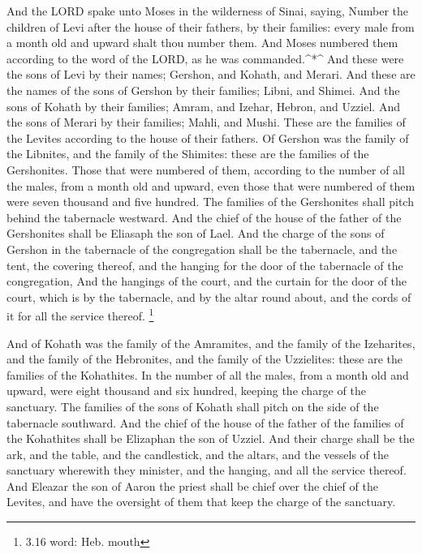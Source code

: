  And the LORD spake unto Moses in the wilderness of Sinai,
saying,  Number the children of Levi after the house of
their fathers, by their families: every male from a month old and upward
shalt thou number them.  And Moses numbered them according
to the word of the LORD, as he was commanded.\^{}*\^{}  And
these were the sons of Levi by their names; Gershon, and Kohath, and
Merari.  And these are the names of the sons of Gershon by
their families; Libni, and Shimei.  And the sons of Kohath
by their families; Amram, and Izehar, Hebron, and Uzziel. 
And the sons of Merari by their families; Mahli, and Mushi. These are
the families of the Levites according to the house of their fathers.
 Of Gershon was the family of the Libnites, and the family
of the Shimites: these are the families of the Gershonites.
 Those that were numbered of them, according to the number
of all the males, from a month old and upward, even those that were
numbered of them were seven thousand and five hundred.  The
families of the Gershonites shall pitch behind the tabernacle westward.
 And the chief of the house of the father of the
Gershonites shall be Eliasaph the son of Lael.  And the
charge of the sons of Gershon in the tabernacle of the congregation
shall be the tabernacle, and the tent, the covering thereof, and the
hanging for the door of the tabernacle of the congregation,
 And the hangings of the court, and the curtain for the
door of the court, which is by the tabernacle, and by the altar round
about, and the cords of it for all the service thereof. \footnote{3.16
  word: Heb. mouth}

 And of Kohath was the family of the Amramites, and the
family of the Izeharites, and the family of the Hebronites, and the
family of the Uzzielites: these are the families of the Kohathites.
 In the number of all the males, from a month old and
upward, were eight thousand and six hundred, keeping the charge of the
sanctuary.  The families of the sons of Kohath shall pitch
on the side of the tabernacle southward.  And the chief of
the house of the father of the families of the Kohathites shall be
Elizaphan the son of Uzziel.  And their charge shall be the
ark, and the table, and the candlestick, and the altars, and the vessels
of the sanctuary wherewith they minister, and the hanging, and all the
service thereof.  And Eleazar the son of Aaron the priest
shall be chief over the chief of the Levites, and have the oversight of
them that keep the charge of the sanctuary.

